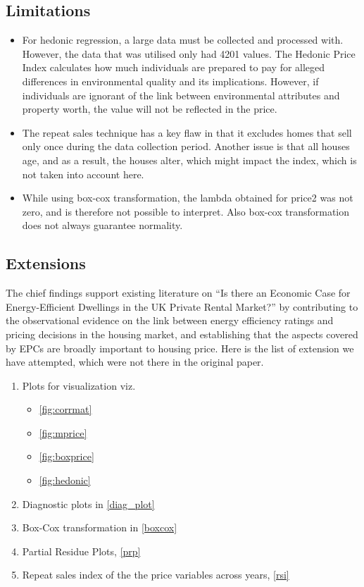 \documentclass[12pt]{article}
\begin{document}
\subsection{Limitations}
\begin{itemize}
    \item For hedonic regression, a large  data must be collected and processed with. However, the data that was utilised only had 4201 values. The Hedonic Price Index calculates how much individuals are prepared to pay for alleged differences in environmental quality and its implications. However, if individuals are ignorant of the link between environmental attributes and property worth, the value will not be reflected in the price. 
    \item The repeat sales technique has a key flaw in that it excludes homes that sell only once during the data collection period. Another issue is that all houses age, and as a result, the houses alter, which might impact the index, which is not taken into account here.
    \item While using box-cox transformation, the lambda obtained for \gls{price2} was not zero, and is therefore not possible to interpret. Also box-cox transformation does not always guarantee normality.
\end{itemize}
\subsection{Extensions}
The chief findings support existing literature on “Is there an Economic Case for Energy-Efficient Dwellings in the UK Private Rental Market?” by contributing to the observational evidence on the link between energy efficiency ratings and pricing decisions in the housing market, and establishing that the aspects covered by EPCs are broadly important to housing price.
Here is the list of extension we have attempted, which were not there in the original paper.
\begin{enumerate}
    \item Plots for visualization viz.
    \begin{itemize}
        \item \autoref{fig:corrmat}
        \item \autoref{fig:mprice}
        \item \autoref{fig:boxprice}
        \item \autoref{fig:hedonic}
    \end{itemize}
    \item Diagnostic plots in \autoref{diag_plot}
    \item Box-Cox transformation in \autoref{boxcox}
    \item Partial Residue Plots, \autoref{prp}
    \item Repeat sales index of the the price variables across years, \autoref{rsi}
\end{enumerate}
\end{document}

